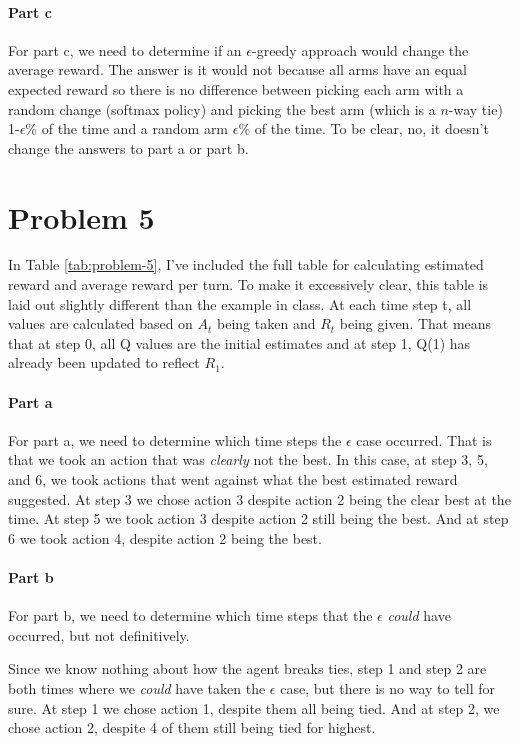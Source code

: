 \documentclass[12pt]{article}
\begin{document}
\paragraph{Part c} For part c, we need to determine if an $\epsilon$-greedy approach would change the average reward. The answer is it would not because all arms have an equal expected reward so there is no difference between picking each arm with a random change (softmax policy) and picking the best arm (which is a $n$-way tie) 1-$\epsilon$\% of the time and a random arm $\epsilon$\% of the time. To be clear, no, it doesn't change the answers to part a or part b.

\section{Problem 5}

In Table \ref{tab:problem-5}, I've included the full table for calculating estimated reward and average reward per turn. To make it excessively clear, this table is laid out slightly different than the example in class. At each time step t, all values are calculated based on $A_t$ being taken and $R_t$ being given. That means that at step 0, all Q values are the initial estimates and at step 1, Q(1) has already been updated to reflect $R_1$.

\paragraph{Part a} For part a, we need to determine which time steps the $\epsilon$ case occurred.
That is that we took an action that was \textit{clearly} not the best.
In this case, at step 3, 5, and 6, we took actions that went against what the best estimated reward suggested.
At step 3 we chose action 3 despite action 2 being the clear best at the time.
At step 5 we took action 3 despite action 2 still being the best.
And at step 6 we took action 4, despite action 2 being the best.

\paragraph{Part b} For part b, we need to determine which time steps that the $\epsilon$ \textit{could} have occurred, but not definitively.

Since we know nothing about how the agent breaks ties, step 1 and step 2 are both times where we \textit{could} have taken the $\epsilon$ case, but there is no way to tell for sure.
At step 1 we chose action 1, despite them all being tied.
And at step 2, we chose action 2, despite 4 of them still being tied for highest.
\end{document}
